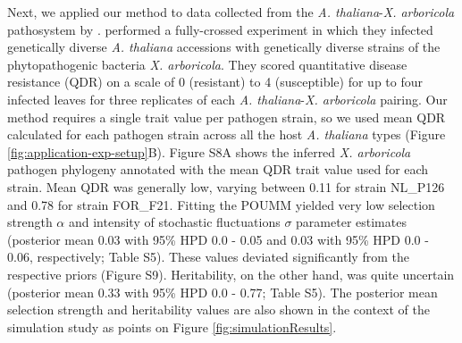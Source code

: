 \documentclass[11pt]{article}
\begin{document}
\begin{linenumbers}
Next, we applied our method to data collected from the \emph{A. thaliana}-\emph{X. arboricola} pathosystem by \cite{Wang2018Two-wayGenomes}. \cite{Wang2018Two-wayGenomes} performed a fully-crossed experiment in which they infected genetically diverse \emph{A. thaliana} accessions with genetically diverse strains of the phytopathogenic bacteria \emph{X. arboricola}. They scored quantitative disease resistance (QDR) on a scale of 0 (resistant) to 4 (susceptible) for up to four infected leaves for three replicates of each \emph{A. thaliana}-\emph{X. arboricola} pairing. Our method requires a single trait value per pathogen strain, so we used mean QDR calculated for each pathogen strain across all the host \emph{A. thaliana} types (Figure \ref{fig:application-exp-setup}B). Figure S8A shows the inferred \emph{X. arboricola} pathogen phylogeny annotated with the  mean QDR trait value used for each strain. Mean QDR  was generally low, varying between 0.11 for strain NL\_P126 and 0.78 for strain FOR\_F21. Fitting the POUMM yielded very low selection strength $\alpha$ and intensity of stochastic fluctuations  $\sigma$ parameter estimates (posterior mean 0.03 with 95\% HPD 0.0 - 0.05 and 0.03 with 95\% HPD 0.0 - 0.06, respectively; Table S5). These values deviated significantly from the respective priors (Figure S9). Heritability, on the other hand, was quite uncertain (posterior mean 0.33 with 95\% HPD 0.0 - 0.77; Table S5). The posterior mean selection strength and heritability values are also shown in the context of the simulation study as points on Figure \ref{fig:simulationResults}.


\end{linenumbers}
\end{document}
